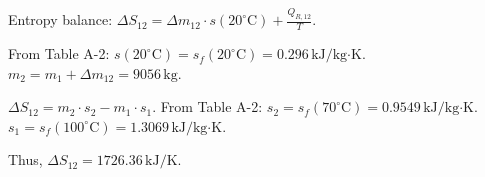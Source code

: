 Entropy balance:  
\( \Delta S_{12} = \Delta m_{12} \cdot s(20^\circ \text{C}) + \frac{Q_{R,12}}{T} \).  

From Table A-2:  
\( s(20^\circ \text{C}) = s_f(20^\circ \text{C}) = 0.296 \, \text{kJ/kg·K} \).  
\( m_2 = m_1 + \Delta m_{12} = 9056 \, \text{kg} \).  

\( \Delta S_{12} = m_2 \cdot s_2 - m_1 \cdot s_1 \).  
From Table A-2:  
\( s_2 = s_f(70^\circ \text{C}) = 0.9549 \, \text{kJ/kg·K} \).  
\( s_1 = s_f(100^\circ \text{C}) = 1.3069 \, \text{kJ/kg·K} \).  

Thus, \( \Delta S_{12} = 1726.36 \, \text{kJ/K} \).